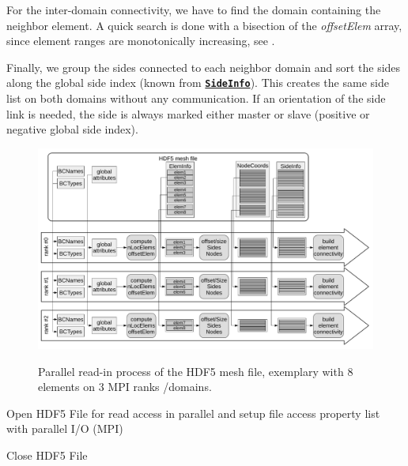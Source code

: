 \documentclass[a4paper,headsepline]{scrreprt}
\newcommand\rf[1]{\prettyref{#1}}
\newcommand\ttbf[1]{\textbf{\texttt{#1}}}
\newcommand\SideInfo{\hyperlink{SideInfo}{\ttbf{SideInfo}}}
\begin{document}
For the inter-domain connectivity, we have to find the domain containing the neighbor element. A quick search is done with a bisection of the \textit{offsetElem} array, since element ranges are monotonically increasing, see \rf{alg:elemID}.

Finally, we group the sides connected to each neighbor domain and sort the sides along the global side index (known from \SideInfo). This creates the same side list on both domains without any communication. If an orientation of the side link is needed, the side is always marked either master or slave (positive or negative global side index).

\begin{landscape}
\begin{figure}[h!]
\centering
\includegraphics[width=1.5\textwidth]{pics/parallel_readin.pdf} \\
\caption{Parallel read-in process of the HDF5 mesh file, exemplary with 8 elements on 3 MPI ranks /domains.}
\label{fig:readin}
\end{figure}
\end{landscape}



\begin{algorithm}[h!]
 \caption{Open HDF5 File for read access in parallel and setup file access property list with parallel I/O (MPI)\label{alg:hdfopen}}
 \DontPrintSemicolon
\end{algorithm}

\begin{algorithm}[h!]
 \caption{Close HDF5 File \label{alg:hdfclose}}
 \DontPrintSemicolon
\end{algorithm}
\end{document}
